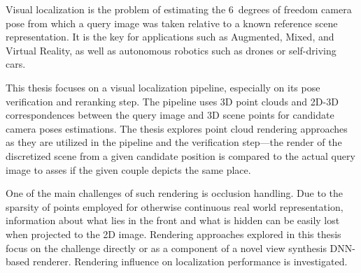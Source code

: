 \documentclass[12pt]{report}
\begin{document}
Visual localization is the problem of estimating the 6~degrees of freedom
camera pose from which a query image was taken relative to a known
reference scene representation. It is the key for applications such as
Augmented, Mixed, and Virtual Reality, as well as autonomous robotics
such as drones or self-driving cars.

This thesis focuses on a visual localization pipeline, especially on
its pose verification and reranking step. The pipeline uses 3D point clouds
and 2D-3D correspondences between the query image and 3D scene points for
candidate camera poses estimations. The thesis explores point cloud
rendering approaches as they are utilized in the pipeline and the
verification step---the render of the discretized scene from a given
candidate position is compared to the actual query image to asses if the
given couple depicts the same place.

One of the main challenges of such rendering is occlusion handling. Due
to the sparsity of points employed for otherwise continuous real world
representation, information about what lies in the front and what is
hidden can be easily lost when projected to the 2D image. Rendering
approaches explored in this thesis focus on the challenge directly or
as a component of a novel view synthesis DNN-based renderer.
Rendering influence on localization performance is investigated.
\end{document}
